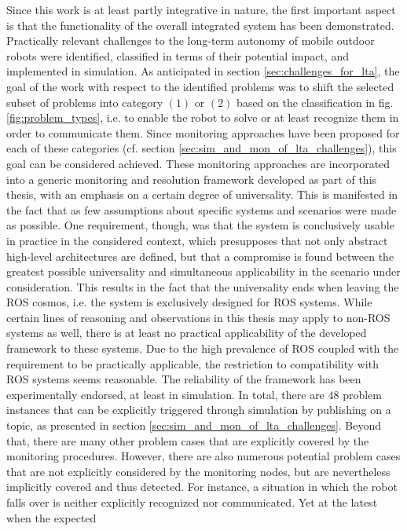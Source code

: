 \documentclass[english, master, utf8]{base/thesis_KBS}
\begin{document}
Since this work is at least partly integrative in nature, the first important aspect is that the functionality of the overall integrated system has been demonstrated.
Practically relevant challenges to the long-term autonomy of mobile outdoor robots were identified, classified in terms of their potential impact, and implemented in simulation.
As anticipated in section \ref{sec:challenges_for_lta}, the goal of the work with respect to the identified problems was to shift the selected subset of problems into category
$(1)$ or $(2)$ based on the classification in fig. \ref{fig:problem_types}, i.e. to enable the robot to solve or at least recognize them in order to communicate them.
Since monitoring approaches have been proposed for each of these categories (cf. section \ref{sec:sim_and_mon_of_lta_challenges}), this goal can be considered achieved. These
monitoring approaches are incorporated into a generic monitoring and resolution framework developed as part of this thesis, with an emphasis on a certain degree of universality.
This is manifested in the fact that as few assumptions about specific systems and scenarios were made as possible. One requirement, though, was that the system is conclusively usable
in practice in the considered context, which presupposes that not only abstract high-level architectures are defined, but that a compromise is found between the greatest possible
universality and simultaneous applicability in the scenario under consideration. This results in the fact that the universality ends when leaving the ROS cosmos, i.e. the system is
exclusively designed for ROS systems. While certain lines of reasoning and observations in this thesis may apply to non-ROS systems as well, there is at least no practical
applicability of the developed framework to these systems. Due to the high prevalence of ROS coupled with the requirement to be practically applicable, the restriction to
compatibility with ROS systems seems reasonable.
The reliability of the framework has been experimentally endorsed, at least in simulation. In total, there are $48$ problem instances that can be explicitly triggered
through simulation by publishing on a topic, as presented in section \ref{sec:sim_and_mon_of_lta_challenges}. Beyond that, there are many other problem cases that are explicitly
covered by the monitoring procedures. However, there are also numerous potential problem cases that are not explicitly considered by the monitoring nodes, but are nevertheless
implicitly covered and thus detected. For instance, a situation in which the robot falls over is neither explicitly recognized nor communicated. Yet at the latest when the expected
\end{document}
